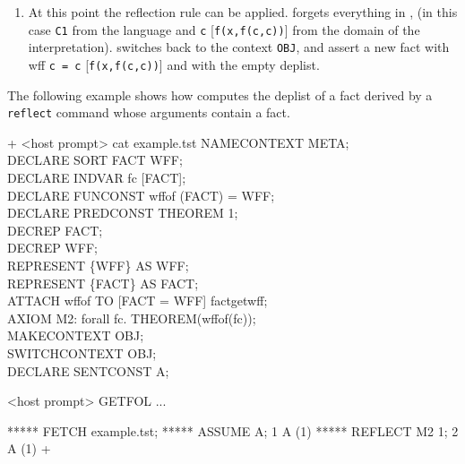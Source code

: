 {\begin{enumerate}
    turns out to be the name of {\tt c = c} [{\tt f(x,f(c,c)) = f(x,f(c,c))}].
    So the result of this step is something that could be written as 
    {\tt THEOREM(``c =  c'')}.
    [{\tt THEOREM(``f(x,f(c,c)) = f(x,f(c,c))'')}],  where {\tt ``c = c''}
    [{\tt ``f(x,f(c,c)) = f(x,f(c,c))''}]  should be read as  the  name  of
    {\tt c = c} [{\tt (f(f(c,c),c),f(x,c)) = f(x,f(c,c))}]
	\item
    At  this point the  reflection rule can be applied.
    {\GF} forgets everything in {\meta}, (in this case {\tt C1} from the
    language and {\tt c} [{\tt f(x,f(c,c))}] from the domain of the
   	interpretation).
    {\GF} switches back to the context {\tt OBJ}, and assert a new fact
    with wff  {\tt  c = c} [{\tt  f(x,f(c,c))}] and with the empty deplist.
    \end{enumerate}

    The following example shows how {\GF} computes the deplist of a fact derived 
    by a {\tt reflect} command whose arguments contain a fact.
}


\gfexample+
   <host prompt> cat example.tst
   NAMECONTEXT META;\\
   DECLARE SORT FACT WFF;\\
   DECLARE INDVAR fc [FACT];\\
   DECLARE FUNCONST wffof (FACT) = WFF;\\
   DECLARE PREDCONST THEOREM 1;\\
   DECREP FACT;\\
   DECREP WFF; \\
   REPRESENT \{WFF\} AS WFF; \\
   REPRESENT \{FACT\} AS FACT;\\
   ATTACH wffof TO [FACT = WFF] fact\-get\-wff;\\
   AXIOM M2: forall fc. THEOREM(wffof(fc));\\
   MAKECONTEXT OBJ;\\
   SWITCHCONTEXT OBJ;\\
   DECLARE SENTCONST A;

   <host prompt> GETFOL
   ...

   ***** FETCH example.tst;
   ***** ASSUME A;
   1   A     (1)
   ***** REFLECT M2 1;
   2   A     (1)
+

